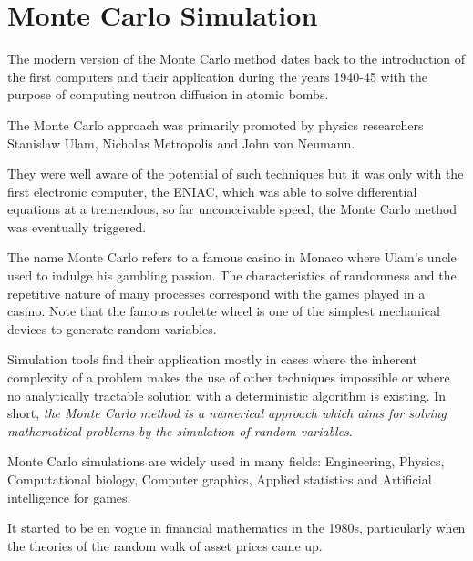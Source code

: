 \chapter{Monte Carlo Simulation}\label{cap:montecarlo}

The modern version of the Monte Carlo method dates back to the introduction of the first computers and their application during the years 1940-45 with the purpose of computing neutron diffusion in atomic bombs.

The Monte Carlo approach was primarily promoted by physics researchers Stanislaw Ulam, Nicholas Metropolis and John von Neumann.

They were well aware of the potential of such techniques but it was only with the first electronic computer, the ENIAC, which was able to solve differential equations at a tremendous, so far unconceivable speed, the Monte Carlo method was eventually triggered.

The name Monte Carlo refers to a famous casino in Monaco where Ulam's
uncle used to indulge his gambling passion. 
The characteristics of randomness and the repetitive nature of many processes correspond with the games played in a casino. Note that the famous roulette wheel is one of the simplest mechanical devices to generate random variables.

Simulation tools find their application mostly in cases where the
inherent complexity of a problem makes the use of other techniques
impossible or where no analytically tractable solution with a
deterministic algorithm is existing. In short, \emph{the Monte Carlo method is
a numerical approach which aims for solving mathematical problems by the
simulation of random variables}.

Monte Carlo simulations are widely used in many fields: Engineering,
Physics, Computational biology, Computer graphics, Applied statistics and 
Artificial intelligence for games.

It started to be en vogue in financial mathematics in the 1980s,
particularly when the theories of the random walk of asset prices came
up.



